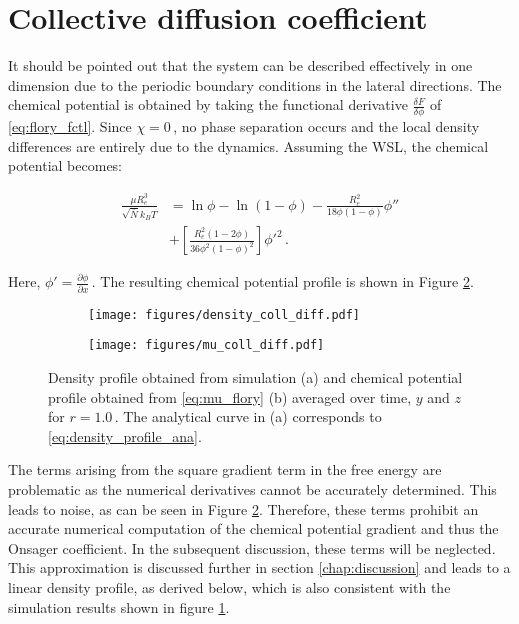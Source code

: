 \documentclass[bachelor,       %
               twoside,        %
               BCOR10mm,       %
                ngerman,english  %
               ]{GAUBM}
\begin{document}
\section{Collective diffusion coefficient}
\label{sec:colldiff}

It should be pointed out that the system can be described effectively in one dimension due to the periodic boundary conditions in the lateral directions. The chemical potential is obtained by taking the functional derivative $\frac{\delta F}{\delta\phi}$ of \eqref{eq:flory_fctl}. Since $\chi=0\,$, no phase separation occurs and the local density differences are entirely due to the dynamics. Assuming the WSL, the chemical potential becomes:


\begin{align}
  \frac{\mu R_e^3}{\sqrt{\bar N} k_BT}&=\ln\phi-\ln(1-\phi)-\frac{R_e^2}{18\phi(1-\phi)}\phi''\nonumber \\ &+\left[\frac{R_e^2(1-2\phi)}{36\phi^2(1-\phi)^2}\right]\phi'^2\,.
  \label{eq:mu_flory}
\end{align}

Here, $\phi'=\frac{\partial\phi}{\partial x}\,.$ The resulting chemical potential profile is shown in Figure \ref{fig:chemical_potential}.




\begin{figure}[h]
  \centering
  \begin{subfigure}[b]{0.45\textwidth}
      \centering
      \texttt{[image: figures/density\_coll\_diff.pdf]}
      \caption{}
      \label{fig:density_profile}
  \end{subfigure}
  \hfill
  \begin{subfigure}[b]{0.45\textwidth}
      \centering
      \texttt{[image: figures/mu\_coll\_diff.pdf]}
      \caption{}
      \label{fig:chemical_potential}
  \end{subfigure}
     \caption{Density profile obtained from simulation (a) and chemical potential profile obtained from \eqref{eq:mu_flory} (b)  averaged over time, $y$ and $z$ for $r=1.0\,$. The analytical curve in (a) corresponds to \eqref{eq:density_profile_ana}.}
     \label{fig:mu_phi}
\end{figure}


The terms arising from the square gradient term in the free energy are problematic as the numerical derivatives cannot be accurately determined. This leads to noise, as can be seen in Figure \ref{fig:chemical_potential}. Therefore, these terms prohibit an accurate numerical computation of the chemical potential gradient and thus the Onsager coefficient. In the subsequent discussion, these terms will be neglected. This approximation is discussed further in section \ref{chap:discussion} and leads to a linear density profile, as derived below, which is also consistent with the simulation results shown in figure \ref{fig:density_profile}.
\end{document}
